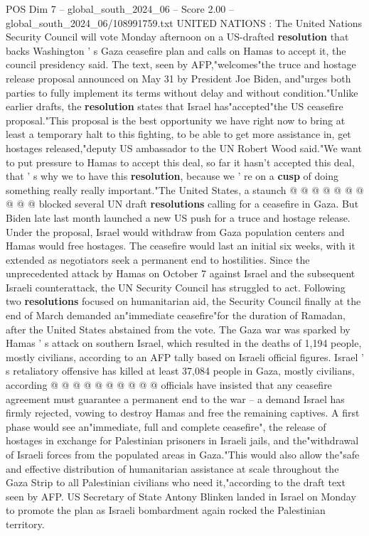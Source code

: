 \begin{textsample}{POS Dim 7 – global\_south\_2024\_06 – Score 2.00 – global\_south\_2024\_06/108991759.txt}  \label{ex:f7_pos_086}
UNITED NATIONS : The United Nations Security Council will vote Monday afternoon on a US-drafted \textbf{resolution} that backs Washington ' s Gaza ceasefire plan and calls on Hamas to accept it, the council presidency said.
The text, seen by AFP,"welcomes"the truce and hostage release proposal announced on May 31 by President Joe Biden, and"urges both parties to fully implement its terms without delay and without condition."Unlike earlier drafts, the \textbf{resolution} states that Israel has"accepted"the US ceasefire proposal."This proposal is the best opportunity we have right now to bring at least a temporary halt to this fighting, to be able to get more assistance in, get hostages released,"deputy US ambassador to the UN Robert Wood said."We want to put pressure to Hamas to accept this deal, so far it hasn't accepted this deal, that ' s why we to have this \textbf{resolution}, because we ' re on a \textbf{cusp} of doing something really really important."The United States, a staunch @ @ @ @ @ @ @ @ @ @ blocked several UN draft \textbf{resolutions} calling for a ceasefire in Gaza.
But Biden late last month launched a new US push for a truce and hostage release.
Under the proposal, Israel would withdraw from Gaza population centers and Hamas would free hostages.
The ceasefire would last an initial six weeks, with it extended as negotiators seek a permanent end to hostilities.
Since the unprecedented attack by Hamas on October 7 against Israel and the subsequent Israeli counterattack, the UN Security Council has struggled to act.
Following two \textbf{resolutions} focused on humanitarian aid, the Security Council finally at the end of March demanded an"immediate ceasefire"for the duration of Ramadan, after the United States abstained from the vote.
The Gaza war was sparked by Hamas ' s attack on southern Israel, which resulted in the deaths of 1,194 people, mostly civilians, according to an AFP tally based on Israeli official figures.
Israel ' s retaliatory offensive has killed at least 37,084 people in Gaza, mostly civilians, according @ @ @ @ @ @ @ @ @ @ officials have insisted that any ceasefire agreement must guarantee a permanent end to the war -- a demand Israel has firmly rejected, vowing to destroy Hamas and free the remaining captives.
A first phase would see an"immediate, full and complete ceasefire", the release of hostages in exchange for Palestinian prisoners in Israeli jails, and the"withdrawal of Israeli forces from the populated areas in Gaza."This would also allow the"safe and effective distribution of humanitarian assistance at scale throughout the Gaza Strip to all Palestinian civilians who need it,"according to the draft text seen by AFP.
US Secretary of State Antony Blinken landed in Israel on Monday to promote the plan as Israeli bombardment again rocked the Palestinian territory.

\end{textsample}
